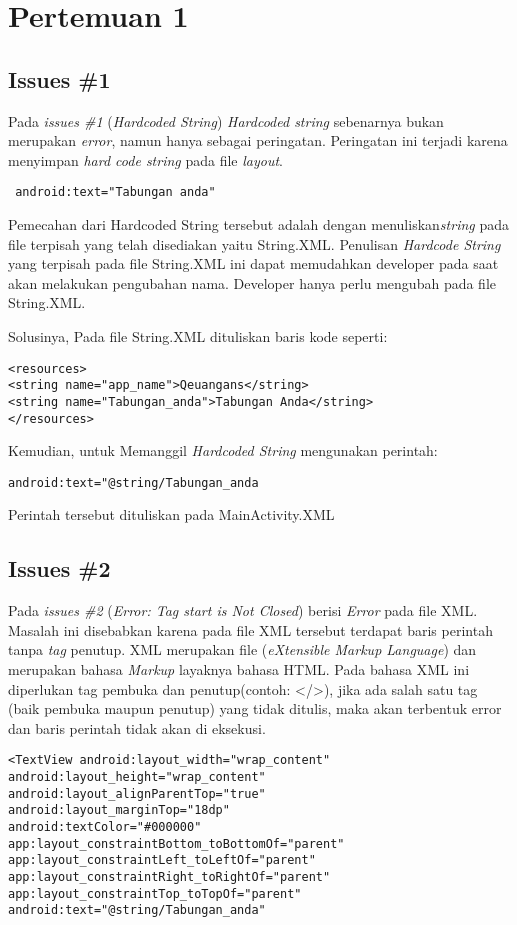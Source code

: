 \chapter{Pertemuan 1}

\section{Issues \#1}
Pada \textit{issues \#1} (\textit{Hardcoded String}) \textit{Hardcoded string} sebenarnya bukan merupakan \textit{error}, namun hanya sebagai peringatan. Peringatan ini terjadi karena menyimpan \textit{hard code string} pada file \textit{layout}. 
\begin{verbatim}
 android:text="Tabungan anda"
\end{verbatim}
Pemecahan dari Hardcoded String tersebut adalah dengan menuliskan\textit{string} pada file terpisah yang telah disediakan yaitu String.XML. Penulisan \textit{Hardcode String} yang terpisah pada file String.XML ini dapat memudahkan developer pada saat akan melakukan pengubahan nama. Developer hanya perlu mengubah pada file String.XML.

Solusinya, Pada file String.XML dituliskan baris kode seperti:
\begin{verbatim}
<resources>
<string name="app_name">Qeuangans</string>
<string name="Tabungan_anda">Tabungan Anda</string>
</resources>
\end{verbatim}

Kemudian, untuk Memanggil \textit{Hardcoded String} mengunakan perintah:
\begin{verbatim}
android:text="@string/Tabungan_anda
\end{verbatim}
Perintah tersebut dituliskan pada MainActivity.XML

\section{Issues \#2}
Pada \textit{issues \#2} (\textit{Error: Tag start is Not Closed}) berisi \textit{Error} pada file XML. Masalah ini disebabkan karena pada file XML tersebut terdapat baris perintah tanpa \textit{tag} penutup. XML merupakan file (\textit{eXtensible Markup Language}) dan merupakan bahasa \textit{Markup} layaknya bahasa HTML. Pada bahasa XML ini diperlukan tag pembuka dan penutup(contoh: </>), jika ada salah satu tag (baik pembuka maupun penutup) yang tidak ditulis, maka akan terbentuk error dan baris perintah tidak akan di eksekusi.
\begin{verbatim}
<TextView android:layout_width="wrap_content"
android:layout_height="wrap_content"
android:layout_alignParentTop="true"
android:layout_marginTop="18dp"
android:textColor="#000000"
app:layout_constraintBottom_toBottomOf="parent"
app:layout_constraintLeft_toLeftOf="parent"
app:layout_constraintRight_toRightOf="parent"
app:layout_constraintTop_toTopOf="parent"
android:text="@string/Tabungan_anda" 
\end{verbatim}

